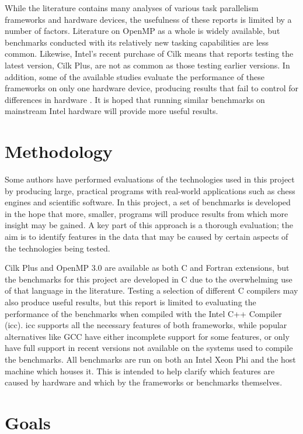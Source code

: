 \documentclass{report}
\begin{document}
While the literature contains many analyses of various task parallelism frameworks and hardware devices, the usefulness of these reports is limited by a number of factors. Literature on OpenMP as a whole is widely available, but benchmarks conducted with its relatively new tasking capabilities are less common. Likewise, Intel's recent purchase of Cilk means that reports testing the latest version, Cilk Plus, are not as common as those testing earlier versions. In addition, some of the available studies evaluate the performance of these frameworks on only one hardware device, producing results that fail to control for differences in hardware \cite{Duran09}. It is hoped that running similar benchmarks on mainstream Intel hardware will provide more useful results.

\section{Methodology} \label{Sec:methodology}

Some authors have performed evaluations of the technologies used in this project by producing large, practical programs with real-world applications such as chess engines and scientific software\cite{Dailey01}. In this project, a set of benchmarks is developed in the hope that more, smaller, programs will produce results from which more insight may be gained. A key part of this approach is a thorough evaluation; the aim is to identify features in the data that may be caused by certain aspects of the technologies being tested.

Cilk Plus and OpenMP 3.0 are available as both C and Fortran extensions, but the benchmarks for this project are developed in C due to the overwhelming use of that language in the literature. Testing a selection of different C compilers may also produce useful results, but this report is limited to evaluating the performance of the benchmarks when compiled with the Intel C++ Compiler (icc). icc supports all the necessary features of both frameworks, while popular alternatives like GCC have either incomplete support for some features, or only have full support in recent versions not available on the systems used to compile the benchmarks. All benchmarks are run on both an Intel Xeon Phi and the host machine which houses it. This is intended to help clarify which features are caused by hardware and which by the frameworks or benchmarks themselves.

\section{Goals} \label{Sec:goals}
\end{document}
